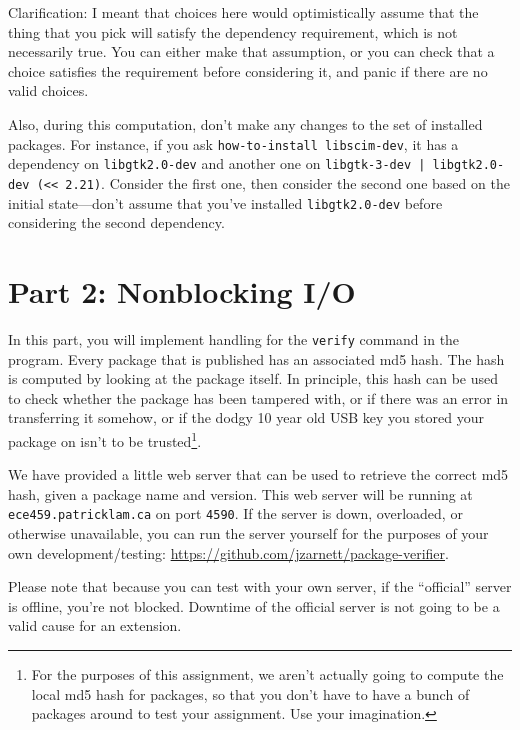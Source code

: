 \documentclass[12pt]{article}
\renewcommand{\_}{\kern-1.5pt\textunderscore\kern-1.5pt}
\begin{document}
\vspace{1em}
Clarification: I meant that choices here would optimistically assume that the thing that you pick will satisfy the dependency requirement, which is not necessarily true. You can either make that assumption, or you can check that a choice satisfies the requirement before considering it, and panic if there are no valid choices.

\vspace*{1em}
Also, during this computation, don't make any changes to the set of installed packages. For instance, if you ask \texttt{how-to-install libscim-dev}, it has a dependency on \verb+libgtk2.0-dev+ and another one on \verb+libgtk-3-dev | libgtk2.0-dev (<< 2.21)+. Consider the first one, then consider the second one based on the initial state---don't assume that you've installed \verb+libgtk2.0-dev+ before considering the second dependency.


\vspace{\baselineskip}
\section*{Part 2: Nonblocking I/O }\par

In this part, you will implement handling for the \texttt{verify} command in the program. Every package that is published has an associated md5 hash. The hash is computed by looking at the package itself. In principle, this hash can be used to check whether the package has been tampered with, or if there was an error in transferring it somehow, or if the dodgy 10 year old USB key you stored your package on isn't to be trusted\footnote{For the purposes of this assignment, we aren't actually going to compute the local md5 hash for packages, so that you don't have to have a bunch of packages around to test your assignment. Use your imagination.}.\par

\vspace{1em}
We have provided a little web server that can be used to retrieve the correct md5 hash, given a package name and version. This web server will be running at \texttt{ece459.patricklam.ca} on port \texttt{4590}. If the server is down, overloaded, or otherwise unavailable, you can run the server yourself for the purposes of your own development/testing: \url{https://github.com/jzarnett/package-verifier}. 

Please note that because you can test with your own server, if the ``official'' server is offline, you're not blocked. Downtime of the official server is not going to be a valid cause for an extension.
\end{document}
